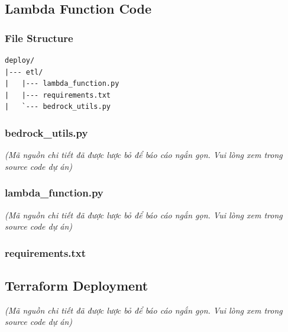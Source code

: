 \hypertarget{lambda-function-code}{%
\subsection{Lambda Function Code}}

\hypertarget{file-structure}{%
\subsubsection{File Structure}}

\begin{verbatim}
deploy/
|--- etl/
|   |--- lambda_function.py
|   |--- requirements.txt
|   `--- bedrock_utils.py
\end{verbatim}

\hypertarget{bedrock_utils.py}{%
\subsubsection{bedrock\_utils.py}}

\emph{(Mã nguồn chi tiết đã được lược bỏ để báo cáo ngắn gọn. Vui lòng
xem trong source code dự án)}

\hypertarget{lambda_function.py}{%
\subsubsection{lambda\_function.py}}

\emph{(Mã nguồn chi tiết đã được lược bỏ để báo cáo ngắn gọn. Vui lòng
xem trong source code dự án)}

\hypertarget{requirements.txt}{%
\subsubsection{requirements.txt}}

\begin{Shaded}
\begin{Highlighting}[]
\end{Highlighting}
\end{Shaded}

\hypertarget{terraform-deployment}{%
\subsection{Terraform Deployment}}

\emph{(Mã nguồn chi tiết đã được lược bỏ để báo cáo ngắn gọn. Vui lòng
xem trong source code dự án)}

